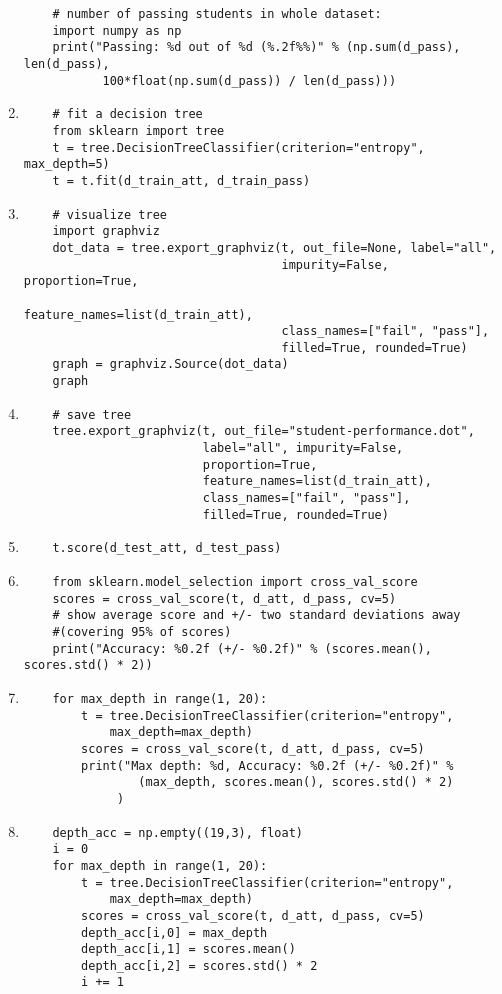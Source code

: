 \begin{enumerate}
\begin{verbatim}
	# number of passing students in whole dataset:
	import numpy as np
	print("Passing: %d out of %d (%.2f%%)" % (np.sum(d_pass), len(d_pass), 
	       100*float(np.sum(d_pass)) / len(d_pass)))
\end{verbatim}
\item 
\begin{verbatim}
	# fit a decision tree
	from sklearn import tree
	t = tree.DecisionTreeClassifier(criterion="entropy", max_depth=5)
	t = t.fit(d_train_att, d_train_pass)
\end{verbatim}
\item
\begin{verbatim}
	# visualize tree
	import graphviz
	dot_data = tree.export_graphviz(t, out_file=None, label="all", 
									impurity=False, proportion=True,
	                                feature_names=list(d_train_att), 
									class_names=["fail", "pass"], 
	                                filled=True, rounded=True)
	graph = graphviz.Source(dot_data)
	graph
\end{verbatim}
\item
\begin{verbatim}
	# save tree
	tree.export_graphviz(t, out_file="student-performance.dot", 
						 label="all", impurity=False, 
						 proportion=True,
	                     feature_names=list(d_train_att), 
	                     class_names=["fail", "pass"], 
	                     filled=True, rounded=True)
\end{verbatim}
\item
\begin{verbatim}
	t.score(d_test_att, d_test_pass)
\end{verbatim}
\item
\begin{verbatim}
	from sklearn.model_selection import cross_val_score
	scores = cross_val_score(t, d_att, d_pass, cv=5)
	# show average score and +/- two standard deviations away 
	#(covering 95% of scores)
	print("Accuracy: %0.2f (+/- %0.2f)" % (scores.mean(), scores.std() * 2))
\end{verbatim}
\item 
\begin{verbatim}
	for max_depth in range(1, 20):
	    t = tree.DecisionTreeClassifier(criterion="entropy", 
			max_depth=max_depth)
	    scores = cross_val_score(t, d_att, d_pass, cv=5)
	    print("Max depth: %d, Accuracy: %0.2f (+/- %0.2f)" % 
				(max_depth, scores.mean(), scores.std() * 2)
			 )
\end{verbatim}
\item
\begin{verbatim}
	depth_acc = np.empty((19,3), float)
	i = 0
	for max_depth in range(1, 20):
	    t = tree.DecisionTreeClassifier(criterion="entropy", 
			max_depth=max_depth)
	    scores = cross_val_score(t, d_att, d_pass, cv=5)
	    depth_acc[i,0] = max_depth
	    depth_acc[i,1] = scores.mean()
	    depth_acc[i,2] = scores.std() * 2
	    i += 1


\end{verbatim}
\end{enumerate}
